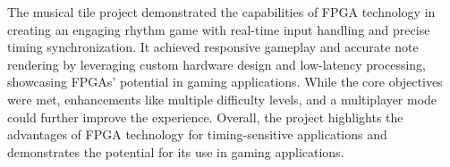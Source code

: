 \documentclass{subfile}
\begin{document}
 
The musical tile project demonstrated the capabilities of FPGA technology in creating an 
engaging rhythm game with real-time input handling and precise timing synchronization. 
It achieved responsive gameplay and accurate note rendering by leveraging custom hardware 
design and low-latency processing, showcasing FPGAs' potential in gaming applications. 
While the core objectives were met, enhancements like multiple
difficulty levels, and a multiplayer mode could further improve the experience. 
Overall, the project highlights the advantages of FPGA technology for 
timing-sensitive applications and demonstrates the potential for its use in gaming 
applications.
\end{document}
